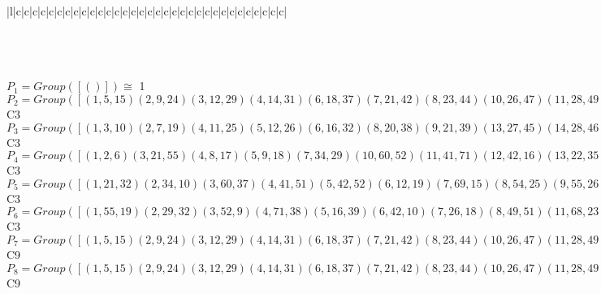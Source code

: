 \documentclass[varwidth=\maxdimen,border=10]{standalone}
\begin{document}
\begin{tabular}
\begin{array}{|l|c|c|c|c|c|c|c|c|c|c|c|c|c|c|c|c|c|c|c|c|c|c|c|c|c|c|c|c|c|c|c|c|c|}
\end{array}\)\\
\ \\
\ \\
$P_{1} = Group( [ () ] )\cong$ 1\ \\
$P_{2} = Group( [ ( 1, 5,15)( 2, 9,24)( 3,12,29)( 4,14,31)( 6,18,37)( 7,21,42)( 8,23,44)(10,26,47)(11,28,49)(13,30,50)(16,34,55)(17,36,57)(19,39,60)(20,41,62)(22,43,63)(25,46,65)(27,48,66)(32,52,69)(33,54,71)(35,56,72)(38,59,74)(40,61,75)(45,64,76)(51,68,78)(53,70,79)(58,73,80)(67,77,81) ] )\cong$ C3\ \\
$P_{3} = Group( [ ( 1, 3,10)( 2, 7,19)( 4,11,25)( 5,12,26)( 6,16,32)( 8,20,38)( 9,21,39)(13,27,45)(14,28,46)(15,29,47)(17,33,51)(18,34,52)(22,40,58)(23,41,59)(24,42,60)(30,48,64)(31,49,65)(35,53,67)(36,54,68)(37,55,69)(43,61,73)(44,62,74)(50,66,76)(56,70,77)(57,71,78)(63,75,80)(72,79,81) ] )\cong$ C3\ \\
$P_{4} = Group( [ ( 1, 2, 6)( 3,21,55)( 4, 8,17)( 5, 9,18)( 7,34,29)(10,60,52)(11,41,71)(12,42,16)(13,22,35)(14,23,36)(15,24,37)(19,69,26)(20,54,49)(25,74,68)(27,61,79)(28,62,33)(30,43,56)(31,44,57)(32,47,39)(38,78,46)(40,70,66)(45,80,77)(48,75,53)(50,63,72)(51,65,59)(58,81,64)(67,76,73) ] )\cong$ C3\ \\
$P_{5} = Group( [ ( 1,21,32)( 2,34,10)( 3,60,37)( 4,41,51)( 5,42,52)( 6,12,19)( 7,69,15)( 8,54,25)( 9,55,26)(11,74,57)(13,61,67)(14,62,68)(16,47,24)(17,28,38)(18,29,39)(20,78,31)(22,70,45)(23,71,46)(27,80,72)(30,75,77)(33,65,44)(35,48,58)(36,49,59)(40,81,50)(43,79,64)(53,76,63)(56,66,73) ] )\cong$ C3\ \\
$P_{6} = Group( [ ( 1,55,19)( 2,29,32)( 3,52, 9)( 4,71,38)( 5,16,39)( 6,42,10)( 7,26,18)( 8,49,51)(11,68,23)(12,69,24)(13,79,58)(14,33,59)(15,34,60)(17,62,25)(20,46,36)(21,47,37)(22,66,67)(27,77,43)(28,78,44)(30,53,73)(31,54,74)(35,75,45)(40,64,56)(41,65,57)(48,81,63)(50,70,80)(61,76,72) ] )\cong$ C3\ \\
$P_{7} = Group( [ ( 1, 5,15)( 2, 9,24)( 3,12,29)( 4,14,31)( 6,18,37)( 7,21,42)( 8,23,44)(10,26,47)(11,28,49)(13,30,50)(16,34,55)(17,36,57)(19,39,60)(20,41,62)(22,43,63)(25,46,65)(27,48,66)(32,52,69)(33,54,71)(35,56,72)(38,59,74)(40,61,75)(45,64,76)(51,68,78)(53,70,79)(58,73,80)(67,77,81), ( 1, 8,35, 5,23,56,15,44,72)( 2,17,13, 9,36,30,24,57,50)( 3,41,79,12,62,53,29,20,70)( 4,22,18,14,43,37,31,63, 6)( 7,54,66,21,71,27,42,33,48)(10,74,77,26,38,81,47,59,67)(11,61,16,28,75,34,49,40,55)(19,78,64,39,51,76,60,68,45)(25,80,69,46,58,32,65,73,52) ] )\cong$ C9\ \\
$P_{8} = Group( [ ( 1, 5,15)( 2, 9,24)( 3,12,29)( 4,14,31)( 6,18,37)( 7,21,42)( 8,23,44)(10,26,47)(11,28,49)(13,30,50)(16,34,55)(17,36,57)(19,39,60)(20,41,62)(22,43,63)(25,46,65)(27,48,66)(32,52,69)(33,54,71)(35,56,72)(38,59,74)(40,61,75)(45,64,76)(51,68,78)(53,70,79)(58,73,80)(67,77,81), ( 1, 4,13, 5,14,30,15,31,50)( 2, 8,22, 9,23,43,24,44,63)( 3,11,27,12,28,48,29,49,66)( 6,17,35,18,36,56,37,57,72)( 7,20,40,21,41,61,42,62,75)(10,25,45,26,46,64,47,65,76)(16,33,53,34,54,70,55,71,79)(19,38,58,39,59,73,60,74,80)(32,51,67,52,68,77,69,78,81) ] )\cong$ C9\ \\

\end{tabular}
\end{document}
